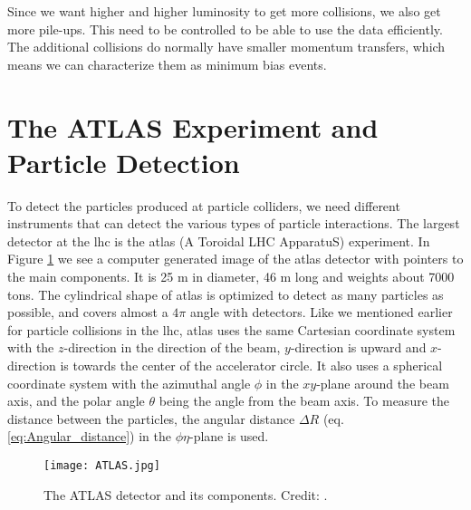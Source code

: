 \documentclass[a4paper, american, 12pt]{report}
\begin{document}
	Since we want higher and higher luminosity to get more collisions, we also get more pile-ups. This need to be controlled to be able to use the data efficiently. The additional collisions do normally have smaller momentum transfers, which means we can characterize them as minimum bias events.
	

	\section{The ATLAS Experiment and Particle Detection} 
	\label{sect:Theory-ATLAS}
	To detect the particles produced at particle colliders, we need different instruments that can detect the various types of particle interactions. The largest detector at the \acrshort{lhc} is the \acrshort{atlas} (A Toroidal LHC ApparatuS) experiment. In Figure \ref{fig:ATLASdetector} we see a computer generated image of the \acrshort{atlas} detector with pointers to the main components. It is 25 m in diameter, 46 m long and weights about 7000 tons. The cylindrical shape of \acrshort{atlas} is optimized to detect as many particles as possible, and covers almost a $4\pi$ angle with detectors. Like we mentioned earlier for particle collisions in the \acrshort{lhc}, \acrshort{atlas} uses the same Cartesian coordinate system with the $z$-direction in the direction of the beam, $y$-direction is upward and $x$-direction is towards the center of the accelerator circle. It also uses a spherical coordinate system with the azimuthal angle $\phi$ in the $xy$-plane around the beam axis, and the polar angle $\theta$ being the angle from the beam axis. To measure the distance between the particles, the angular distance $\Delta R$ (eq.\ref{eq:Angular_distance}) in the $\phi\eta$-plane is used.
	
	\begin{figure}[h!]
		\hspace*{-1.1cm}
		\centering\texttt{[image: ATLAS.jpg]}
		\caption[The ATLAS detector components.]{The ATLAS detector and its components. Credit: \citet{ATLASdetector}.\label{fig:ATLASdetector}}
	\end{figure}  
	
\end{document}
